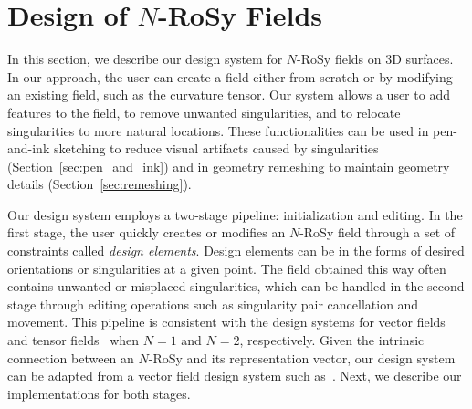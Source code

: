 \documentclass{acmsiggraph}               %
\begin{document}
%
%
%

\section{Design of $N$-RoSy Fields}
\label{sec:design}

In this section, we describe our design system for $N$-RoSy fields
on 3D surfaces. In our approach, the user can create a field either
from scratch or by modifying an existing field, such as the
curvature tensor. Our system allows a user to add features to the
field, to remove unwanted singularities, and to relocate
singularities to more natural locations. These functionalities can
be used in pen-and-ink sketching to reduce visual artifacts caused
by singularities (Section~\ref{sec:pen_and_ink}) and in geometry
remeshing to maintain geometry details
(Section~\ref{sec:remeshing}).

Our design system employs a two-stage pipeline: initialization and
editing. In the first stage, the user quickly creates or modifies an
$N$-RoSy field through a set of constraints called {\em design
elements}. Design elements can be in the forms of desired
orientations or singularities at a given point. The field obtained
this way often contains unwanted or misplaced singularities, which
can be handled in the second stage through editing operations such
as singularity pair cancellation and movement. This pipeline is
consistent with the design systems for vector fields~\cite{Zhang:06}
and tensor fields~\cite{Zhang:07} when $N=1$ and $N=2$,
respectively. Given the intrinsic connection between an $N$-RoSy and
its representation vector, our design system can be adapted from a
vector field design system such as~\cite{Zhang:06}. Next, we
describe our implementations for both stages.
\end{document}
